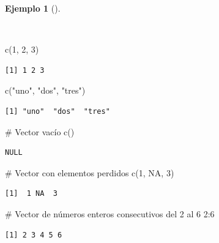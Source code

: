 \documentclass[
  spanish,
  a4paper,
]{scrreport}
\newenvironment{Shaded}{\begin{snugshade}}{\end{snugshade}}
\newcommand{\CommentTok}[1]{\textcolor[rgb]{0.37,0.37,0.37}{#1}}
\newcommand{\ConstantTok}[1]{\textcolor[rgb]{0.56,0.35,0.01}{#1}}
\newcommand{\DecValTok}[1]{\textcolor[rgb]{0.68,0.00,0.00}{#1}}
\newcommand{\FunctionTok}[1]{\textcolor[rgb]{0.28,0.35,0.67}{#1}}
\newcommand{\NormalTok}[1]{\textcolor[rgb]{0.00,0.23,0.31}{#1}}
\newcommand{\SpecialCharTok}[1]{\textcolor[rgb]{0.37,0.37,0.37}{#1}}
\newcommand{\StringTok}[1]{\textcolor[rgb]{0.13,0.47,0.30}{#1}}
\theoremstyle{definition}
\theoremstyle{definition}
\newtheorem{example}{Ejemplo}[chapter]
\theoremstyle{remark}
\begin{document}
\begin{example}[]\protect\hypertarget{exm-construccion-vectores}{}\label{exm-construccion-vectores}

~

\begin{Shaded}
\begin{Highlighting}[]
\FunctionTok{c}\NormalTok{(}\DecValTok{1}\NormalTok{, }\DecValTok{2}\NormalTok{, }\DecValTok{3}\NormalTok{)}
\end{Highlighting}
\end{Shaded}

\begin{verbatim}
[1] 1 2 3
\end{verbatim}

\begin{Shaded}
\begin{Highlighting}[]
\FunctionTok{c}\NormalTok{(}\StringTok{"uno"}\NormalTok{, }\StringTok{"dos"}\NormalTok{, }\StringTok{"tres"}\NormalTok{)}
\end{Highlighting}
\end{Shaded}

\begin{verbatim}
[1] "uno"  "dos"  "tres"
\end{verbatim}

\begin{Shaded}
\begin{Highlighting}[]
\CommentTok{\# Vector vacío}
\FunctionTok{c}\NormalTok{()}
\end{Highlighting}
\end{Shaded}

\begin{verbatim}
NULL
\end{verbatim}

\begin{Shaded}
\begin{Highlighting}[]
\CommentTok{\# Vector con elementos perdidos}
\FunctionTok{c}\NormalTok{(}\DecValTok{1}\NormalTok{, }\ConstantTok{NA}\NormalTok{, }\DecValTok{3}\NormalTok{)}
\end{Highlighting}
\end{Shaded}

\begin{verbatim}
[1]  1 NA  3
\end{verbatim}

\begin{Shaded}
\begin{Highlighting}[]
\CommentTok{\# Vector de números enteros consecutivos del 2 al 6}
\DecValTok{2}\SpecialCharTok{:}\DecValTok{6}
\end{Highlighting}
\end{Shaded}

\begin{verbatim}
[1] 2 3 4 5 6
\end{verbatim}

\end{example}
\end{document}
